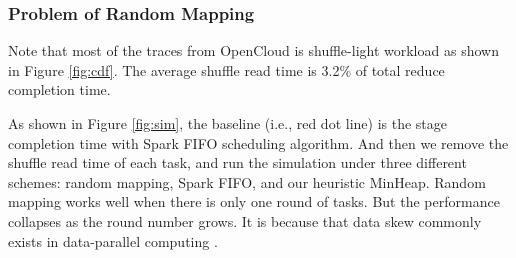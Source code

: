 \subsubsection{Problem of Random Mapping}\label{randomassign}
Note that most of the traces from OpenCloud is shuffle-light workload as shown in Figure \ref{fig:cdf}. 
The average shuffle read time is 3.2\% of total reduce completion time.

As shown in Figure \ref{fig:sim}, the baseline (i.e., red dot line) is the stage completion time with Spark FIFO scheduling algorithm. 
And then we remove the shuffle read time of each task, and run the simulation under three different schemes: random mapping, Spark FIFO, and our heuristic MinHeap.
Random mapping works well when there is only one round of tasks. 
But the performance collapses as the round number grows. 
It is because that data skew commonly exists in data-parallel computing \cite{skewtune, reining, gufler2012load}. 

